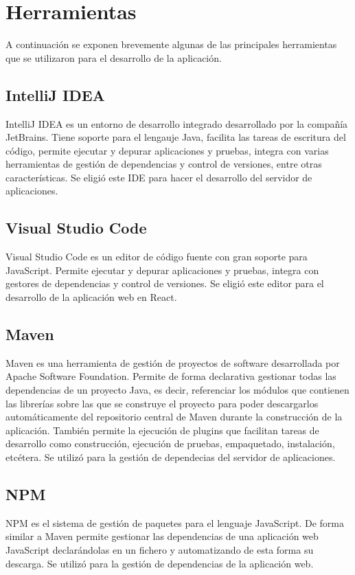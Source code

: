 \documentclass[a4paper, 12pt]{book}
\begin{document}
\section{Herramientas}
\label{sec:intro_tools}
A continuación se exponen brevemente algunas de las principales herramientas que se utilizaron para el desarrollo de la aplicación.

\subsection{IntelliJ IDEA}
\label{subsec:intro_tools_intellij}
IntelliJ IDEA es un entorno de desarrollo integrado desarrollado por la compañía JetBrains. Tiene soporte para el lengauje Java, facilita las tareas de escritura del código, permite ejecutar y depurar aplicaciones y pruebas, integra con varias herramientas de gestión de dependencias y control de versiones, entre otras características. Se eligió este IDE para hacer el desarrollo del servidor de aplicaciones.

\subsection{Visual Studio Code}
\label{subsec:intro_tools_vsc}
Visual Studio Code es un editor de código fuente con gran soporte para JavaScript. Permite ejecutar y depurar aplicaciones y pruebas, integra con gestores de dependencias y control de versiones. Se eligió este editor para el desarrollo de la aplicación web en React.

\subsection{Maven}
\label{subsec:intro_tools_maven}
Maven es una herramienta de gestión de proyectos de software desarrollada por Apache Software Foundation. Permite de forma declarativa gestionar todas las dependencias de un proyecto Java, es decir, referenciar los módulos que contienen las librerías sobre las que se construye el proyecto para poder descargarlos automáticamente del repositorio central de Maven
durante la construcción de la aplicación. También permite la ejecución de plugins que facilitan tareas de desarrollo como construcción, ejecución de pruebas, empaquetado, instalación, etcétera. Se utilizó para la gestión de dependecias del servidor de aplicaciones.

\subsection{NPM}
\label{subsec:intro_tools_npm}
NPM es el sistema de gestión de paquetes para el lenguaje JavaScript. De forma similar a Maven permite gestionar las dependencias de una aplicación web JavaScript declarándolas en un fichero y automatizando de esta forma su descarga. Se utilizó para la gestión de dependencias de la aplicación web.
\end{document}
